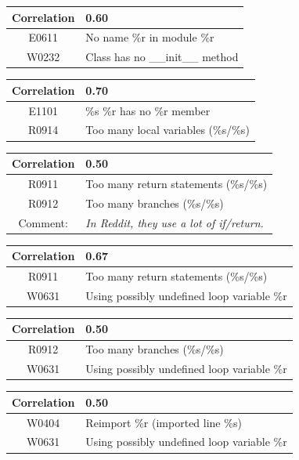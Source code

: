 \documentclass[12pt, a4paper]{article}
\newcommand{\tbf}[1]{\textbf{#1}}
\newcommand{\noi}{\noindent}
\begin{document}
\bigskip \noi
\begin{tabularx}{\textwidth}{|c|X|}
\hline
\tbf{Correlation}   & 0.60 \\
\hline
E0611   & No name \%r in module \%r \\
\hline
W0232   & Class has no \_\_init\_\_ method \\
\hline
\end{tabularx}

\bigskip \noi
\begin{tabularx}{\textwidth}{|c|X|}
\hline
\tbf{Correlation}   & 0.70 \\
\hline
E1101   & \%s \%r has no \%r member \\
\hline
R0914   & Too many local variables (\%s/\%s) \\
\hline
\end{tabularx}

\bigskip \noi
\begin{tabularx}{\textwidth}{|c|X|}
\hline
\tbf{Correlation}   & 0.50 \\
\hline
R0911   & Too many return statements (\%s/\%s) \\
\hline
R0912   & Too many branches (\%s/\%s) \\
\hline
Comment: & \textit{In Reddit, they use a lot of if/return.} \\
\hline
\end{tabularx}

\bigskip \noi
\begin{tabularx}{\textwidth}{|c|X|}
\hline
\tbf{Correlation}   & 0.67 \\
\hline
R0911   & Too many return statements (\%s/\%s) \\
\hline
W0631   & Using possibly undefined loop variable \%r \\
\hline
\end{tabularx}

\bigskip \noi
\begin{tabularx}{\textwidth}{|c|X|}
\hline
\tbf{Correlation}   & 0.50 \\
\hline
R0912   & Too many branches (\%s/\%s) \\
\hline
W0631   & Using possibly undefined loop variable \%r \\
\hline
\end{tabularx}

\bigskip \noi
\begin{tabularx}{\textwidth}{|c|X|}
\hline
\tbf{Correlation}   & 0.50 \\
\hline
W0404   & Reimport \%r (imported line \%s) \\
\hline
W0631   & Using possibly undefined loop variable \%r \\
\hline
\end{tabularx}
\end{document}

